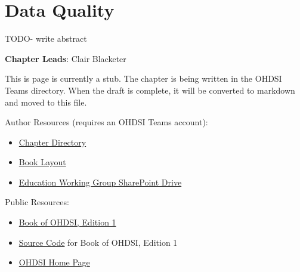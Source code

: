 \documentclass[
  letterpaper,
  paper=7in:10in,
  pagesize=pdftex,
  headinclude=on,
  footinclude=on,
  12pt]{scrbook}
\providecommand{\tightlist}{%
  \setlength{\itemsep}{0pt}\setlength{\parskip}{0pt}}\usepackage{longtable,booktabs,array}
\begin{document}
\chapter{Data Quality}\label{sec-quality-data}

TODO- write abstract

\hfill\break

\textbf{Chapter Leads}: Clair Blacketer

\begin{tcolorbox}[enhanced jigsaw, opacitybacktitle=0.6, coltitle=black, colback=white, bottomrule=.15mm, bottomtitle=1mm, title=\textcolor{quarto-callout-note-color}{\faInfo}\hspace{0.5em}{Note}, titlerule=0mm, rightrule=.15mm, colbacktitle=quarto-callout-note-color!10!white, colframe=quarto-callout-note-color-frame, toptitle=1mm, arc=.35mm, left=2mm, breakable, opacityback=0, leftrule=.75mm, toprule=.15mm]

This is page is currently a stub. The chapter is being written in the
OHDSI Teams directory. When the draft is complete, it will be converted
to markdown and moved to this file.

Author Resources (requires an OHDSI Teams account):

\begin{itemize}
\tightlist
\item
  \href{https://ohdsiorg.sharepoint.com/sites/Workgroup-EducationWorkingGroup/Shared\%20Documents/Forms/AllItems.aspx?id=\%2Fsites\%2FWorkgroup\%2DEducationWorkingGroup\%2FShared\%20Documents\%2FSection\%20IV\%20\%2D\%20Quality\%2FChapter\%2016\%20\%2D\%20Data\%20Quality&viewid=05fec2cc\%2Dec8a\%2D4d04\%2Db565\%2Dcf1289b96f67}{Chapter
  Directory}
\item
  \href{https://ohdsiorg.sharepoint.com/:x:/r/sites/Workgroup-EducationWorkingGroup/_layouts/15/Doc2.aspx?action=edit&sourcedoc=\%7B1fa31e39-1c5f-4918-b878-609ebd9810b3\%7D&wdOrigin=TEAMS-WEB.teamsSdk_ns.rwc&wdExp=TEAMS-TREATMENT&wdhostclicktime=1748104477731&web=1}{Book
  Layout}
\item
  \href{https://ohdsiorg.sharepoint.com/sites/Workgroup-EducationWorkingGroup/Shared\%20Documents/Forms/AllItems.aspx?viewid=05fec2cc\%2Dec8a\%2D4d04\%2Db565\%2Dcf1289b96f67}{Education
  Working Group SharePoint Drive}
\end{itemize}

Public Resources:

\begin{itemize}
\tightlist
\item
  \href{https://ohdsi.github.io/TheBookOfOhdsi/}{Book of OHDSI, Edition
  1}
\item
  \href{https://github.com/OHDSI/TheBookOfOhdsi}{Source Code} for Book
  of OHDSI, Edition 1
\item
  \href{https://ohdsi.org/}{OHDSI Home Page}
\end{itemize}

\end{tcolorbox}
\end{document}
